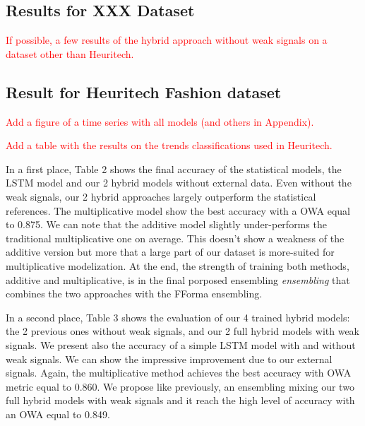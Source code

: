 \documentclass{article} %
\begin{document}
\subsection{Results for XXX Dataset}
\textcolor{red}{If possible, a few results of the hybrid approach without weak signals on a dataset other than Heuritech.}

\subsection{Result for Heuritech Fashion dataset}

\textcolor{red}{Add a figure of a time series with all models (and others in Appendix).}

\vspace{.2cm}

\textcolor{red}{Add a table with the results on the trends classifications used in Heuritech.}

In a first place, Table 2 shows the final accuracy of the statistical models, the LSTM model and our 2 hybrid models without external data. Even without the weak signals, our 2 hybrid approaches largely outperform the statistical references. The multiplicative model show the best accuracy with a OWA equal to 0.875. We can note that the additive model slightly under-performs the traditional multiplicative one on average. This doesn't show a weakness of the additive version but more that a large part of our dataset is more-suited for multiplicative modelization. At the end, the strength of training both methods, additive and multiplicative, is in the final porposed ensembling \textit{ensembling} that combines the two approaches with the FForma ensembling.

In a second place, Table 3 shows the evaluation of our 4 trained hybrid models: the 2 previous ones without weak signals, and our 2 full hybrid models with weak signals. We present also the accuracy of a simple LSTM model with and without weak signals. We can show the impressive improvement due to our external signals. Again, the multiplicative method achieves the best accuracy with OWA metric equal to 0.860. We propose like previously, an ensembling mixing our two full hybrid models with weak signals and it reach the high level of accuracy with an OWA equal to 0.849.
\end{document}
